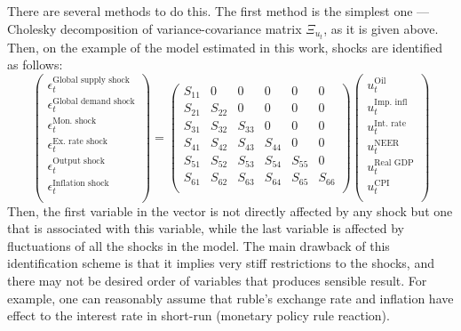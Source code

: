 \documentclass[12pt, a4paper]{extarticle}
\begin{document}
There are several methods to do this. The first method is the simplest one --- Cholesky decomposition of variance-covariance matrix $\Xi_{u_t}$, as it is given above. Then, on the example of the model estimated in this work, shocks are identified as follows:
\begin{equation}
	\begin{pmatrix}
		\epsilon^{\text{Global supply shock}}_t\\
		\epsilon^{\text{Global demand shock}}_t\\
		\epsilon^{\text{Mon. shock}}_t\\
		\epsilon^{\text{Ex. rate shock}}_t\\
		\epsilon^{\text{Output shock}}_t\\
		\epsilon^{\text{Inflation shock}}_t\\
	\end{pmatrix} = 
	\begin{pmatrix}
		S_{11} & 0 & 0 & 0 & 0 & 0\\
		S_{21} & S_{22} & 0 & 0 & 0 & 0\\
		S_{31} & S_{32} & S_{33} & 0 & 0 & 0\\
		S_{41} & S_{42} & S_{43} & S_{44} & 0 & 0\\
		S_{51} & S_{52} & S_{53} & S_{54} & S_{55} & 0\\
		S_{61} & S_{62} & S_{63} & S_{64} & S_{65} & S_{66}\\
	\end{pmatrix} 
	\begin{pmatrix}
		u^{\text{Oil}}_t\\
		u^{\text{Imp. infl}}_t\\
		u^{\text{Int. rate}}_t\\
		u^{\text{NEER}}_t\\
		u^{\text{Real GDP}}_t\\
		u^{\text{CPI}}_t\\
	\end{pmatrix}
\end{equation}
Then, the first variable in the vector is not directly affected by any shock but one that is associated with this variable, while the last variable is affected by fluctuations of all the shocks in the model. The main drawback of this identification scheme is that it implies very stiff restrictions to the shocks, and there may not be desired order of variables that produces sensible result. For example, one can reasonably assume that ruble's exchange rate and inflation have effect to the interest rate in short-run (monetary policy rule reaction).
\end{document}
